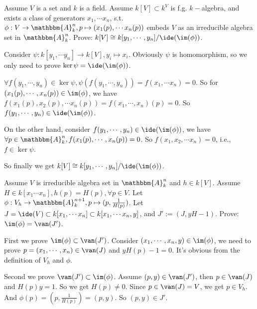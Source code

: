 \documentclass{ctexart}
\newif\ifpreface
\begin{document}
\large
\setlength{\baselineskip}{1.2em}
\ifpreface
	
	\newgeometry{left=2cm,right=2cm,top=2cm,bottom=2cm}
\else
	\maketitle
\fi
\begin{problem}
Assume $V$ is a set and $k$ is a field.
Assume $k[V]\subset k^V$ is f.g. $k-$algebra, and exists a class of generators $x_1,\cdots x_n$, s.t. $\phi:V\to \mathbbm{A}_k^n,p\mapsto (x_1(p),\cdots x_n(p))$ embeds $V$ as an irreducible algebra set in $\mathbbm{A}_k^n$.
Prove: $k[V]\cong k[y_1,\cdots,y_n]/\ide(\im(\phi))$.
\end{problem}

\begin{solution}
	Consider $\psi:k[y_1,\cdots y_n]\to k[V],y_i\mapsto x_i$. Obviously $\psi$ is homomorphism, so we only need to prove $\ker \psi = \ide (\im(\phi))$.

	$\forall f(y_1,\cdots,y_n)\in\ker\psi,\psi(f(y_1,\cdots,y_n))=f(x_1,\cdots x_n)=0$. So for $(x_1(p),\cdots,x_n(p))\in\im(\phi)$, we have $f(x_1(p),x_2(p),\cdots x_n(p))=f(x_1,\cdots,x_n)(p)=0$. So $f(y_1,\cdots,y_n)\in \ide(\im(\phi))$.

	On the other hand, consider $f(y_1,\cdots,y_n)\in \ide(\im(\phi))$, we have $\forall p\in \mathbbm{A}_k^n,f(x_1(p),\cdots ,x_n(p))=0$. So $f(x_1,x_2,\cdots x_n)=0$, i.e., $f\in\ker \psi$.

	So finally we get $k[V]\cong k[y_1,\cdots,y_n]/\ide(\im(\phi))$.
\end{solution}

\begin{problem}
Assume $V$ is irreducible algebra set in $\mathbbm{A}_k^n$ and $h\in k[V]$.
Assume $H\in k[x_1\cdots x_n],h(p)=H(p),\forall p\in V$.
Let $\phi:V_h\to \mathbbm{A}_k^{n+1},p\mapsto (p,\frac{1}{H(p)})$.
Let $J=\ide(V)\subset k[x_1,\cdots x_n]\subset k[x_1,\cdots x_n,y]$,
and $J':=(J,yH-1)$.
Prove: $\im(\phi)=\van(J')$.
\end{problem}

\begin{solution}
	First we prove $\im(\phi)\subset \van(J')$.
	Consider $(x_1,\cdots ,x_n,y)\in\im(\phi)$, we need to prove $p=(x_1,\cdots,x_n)\in \van(J)$ and $yH(p)-1=0$.
	It's obvious from the definition of $V_h$ and $\phi$.

	Second we prove $\van(J')\subset \im(\phi)$.
	Assume $(p,y)\in \van(J')$, then $p\in \van(J)$ and $H(p)y=1$.
	So we get $H(p)\neq 0$. Since $p\in\van(J)=V$, we get $p\in V_h$.
	And $\phi(p)=(p,\frac{1}{H(p)})=(p,y)$. So $(p,y)\in J'$.
\end{solution}
\end{document}
